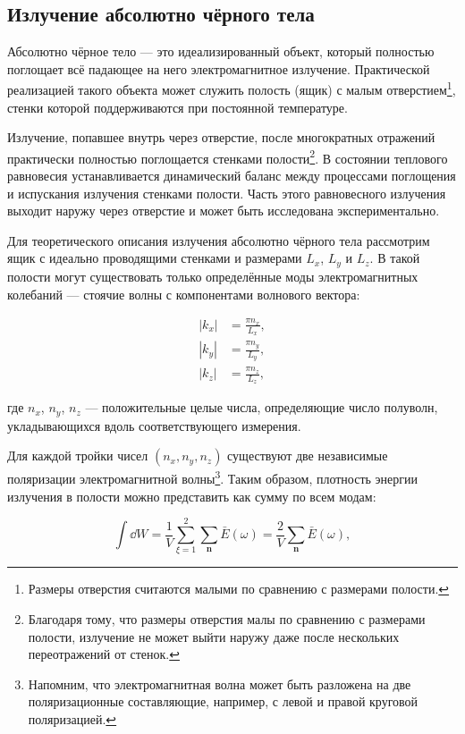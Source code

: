 \documentclass[a4paper, 12pt]{article}
\begin{document}
\subsection{Излучение абсолютно чёрного тела}

Абсолютно чёрное тело — это идеализированный объект, который полностью поглощает
всё падающее на него электромагнитное излучение. Практической реализацией такого
объекта может служить полость (ящик) с малым отверстием\footnote{Размеры отверстия считаются малыми по
сравнению с размерами полости.}, стенки которой поддерживаются при постоянной
температуре.

Излучение, попавшее внутрь через отверстие, после многократных отражений
практически полностью поглощается стенками полости\footnote{Благодаря тому, что размеры
отверстия малы по сравнению с размерами полости, излучение не может выйти наружу
даже после нескольких переотражений от стенок.}. В состоянии теплового равновесия
устанавливается динамический баланс между процессами поглощения и испускания
излучения стенками полости. Часть этого равновесного излучения выходит наружу через
отверстие и может быть исследована экспериментально.

Для теоретического описания излучения абсолютно чёрного тела рассмотрим
ящик с идеально проводящими стенками и размерами $L_x$, $L_y$ и
$L_z$. В такой полости могут существовать только определённые моды
электромагнитных колебаний — стоячие волны с компонентами волнового вектора:

\begin{equation}
\begin{split}
|k_x| &= \frac{\pi n_x}{L_x}, \\
|k_y| &= \frac{\pi n_y}{L_y}, \\
|k_z| &= \frac{\pi n_z}{L_z},
\end{split}
\end{equation}

где $n_x$, $n_y$, $n_z$ — положительные целые числа, определяющие число полуволн,
укладывающихся вдоль соответствующего измерения.


Для каждой тройки чисел $(n_x, n_y, n_z)$ существуют две независимые поляризации
электромагнитной волны\footnote{Напомним, что электромагнитная волна может быть
  разложена на две поляризационные составляющие, например, с левой и правой
  круговой поляризацией.}. Таким образом, плотность энергии излучения в полости
можно представить как сумму по всем модам:

\[
\int \dd{W} = \frac{1}{V} \sum_{\xi=1}^{2} \sum_{\bm{n}} \bar{E}(\omega) = \frac{2}{V} \sum_{\bm{n}} \bar{E}(\omega),
\]
\end{document}
